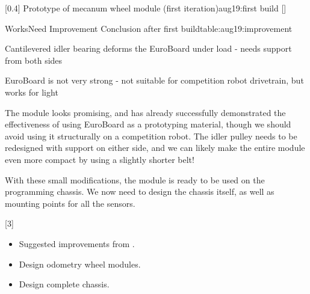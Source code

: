 \begin{Meeting}[Preseason]
[0.4]%
  {Prototype of mecanum wheel module (first iteration)}{aug19:first build}%
  []         

\begin{DescriptionTable*}{Works}{Need Improvement}%
  {Conclusion after first build}{table:aug19:improvement}
   {
    \item Cantilevered idler bearing deforms the EuroBoard under load - %
      needs support from both sides
    \item EuroBoard is not very strong - not suitable for competition %
      robot drivetrain, but works for light 
  }
\end{DescriptionTable*}



The module looks promising, and has already successfully demonstrated
the effectiveness of using EuroBoard as a prototyping material, though
we should avoid using it structurally on a competition robot. The
idler pulley needs to be redesigned with support on either side, and
we can likely make the entire module even more compact by using a
slightly shorter belt!


With these small modifications, the module is ready to be used on the
programming chassis. We now need to design the chassis itself, as well
as mounting points for all the sensors.



[3]

\begin{itemize}
  \item Suggested improvements from .
  \item Design odometry wheel modules.
  \item Design complete chassis.
\end{itemize}


\end{Meeting}
